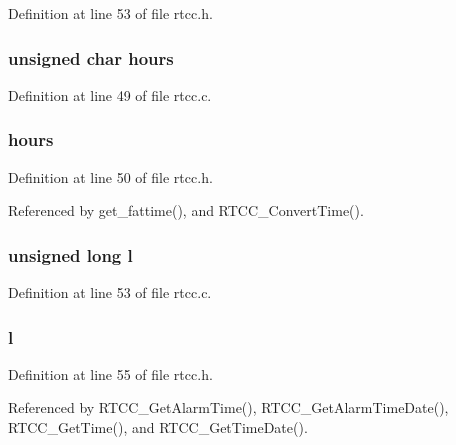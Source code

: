 Definition at line 53 of file rtcc.\-h.

\hypertarget{unionrtcc_time_ad6bf06b59feb7f83117fd66cd2f365ad}{
\subsubsection[{hours}]{\setlength{\rightskip}{0pt plus 5cm}unsigned char hours}}\label{unionrtcc_time_ad6bf06b59feb7f83117fd66cd2f365ad}


Definition at line 49 of file rtcc.\-c.

\hypertarget{unionrtcc_time_af8ebb6bc008ed8d3be395faf75ec1ebc}{
\subsubsection[{hours}]{ hours}}\label{unionrtcc_time_af8ebb6bc008ed8d3be395faf75ec1ebc}


Definition at line 50 of file rtcc.\-h.



Referenced by get\-\_\-fattime(), and R\-T\-C\-C\-\_\-\-Convert\-Time().

\hypertarget{unionrtcc_time_a99612d7a42af4d8bc748c9de9089b41e}{
\subsubsection[{l}]{\setlength{\rightskip}{0pt plus 5cm}unsigned long l}}\label{unionrtcc_time_a99612d7a42af4d8bc748c9de9089b41e}


Definition at line 53 of file rtcc.\-c.

\hypertarget{unionrtcc_time_a97b22435f07e68bf751cddd2226228ab}{
\subsubsection[{l}]{ l}}\label{unionrtcc_time_a97b22435f07e68bf751cddd2226228ab}


Definition at line 55 of file rtcc.\-h.



Referenced by R\-T\-C\-C\-\_\-\-Get\-Alarm\-Time(), R\-T\-C\-C\-\_\-\-Get\-Alarm\-Time\-Date(), R\-T\-C\-C\-\_\-\-Get\-Time(), and R\-T\-C\-C\-\_\-\-Get\-Time\-Date().

